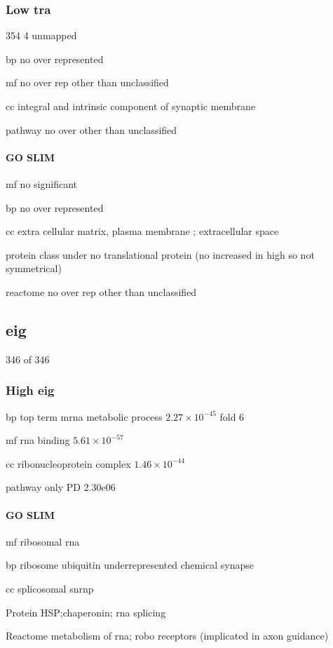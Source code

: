 \clearpage
\subsubsection{Low tra}
354 4 unmapped

bp no over represented

mf no over rep other than unclassified

cc integral and intrinsic component of synaptic membrane

pathway no over other than unclassified

\paragraph{GO SLIM}

mf no significant

bp no over represented

cc extra cellular matrix, plasma membrane ; extracellular space

protein class under no translational protein (no increased in high so not symmetrical)

reactome no over rep other than unclassified

\subsection{eig}

346 of 346

\subsubsection{High eig}

bp top term mrna metabolic process $2.27\times10^{-45}$ fold 6

mf rna binding $5.61\times10^{-57}$

cc ribonucleoprotein complex $1.46\times10^{-44}$

pathway only PD 2.30e06

\paragraph{GO SLIM}

mf ribosomal rna

bp ribosome ubiquitin underrepresented chemical synapse

cc splicosomal snrnp

Protein HSP;chaperonin; rna splicing

Reactome metabolism of rna; robo receptors (implicated in axon guidance)

